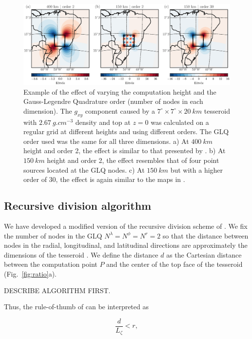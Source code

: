 \documentclass[extra]{gji}
\begin{document}
\begin{figure}
    \centering
    \includegraphics[width=\textwidth]{figs/vary-height-and-order}
    \caption{
        Example of the effect of varying
        the computation height and the Gauss-Legendre Quadrature order
        (number of nodes in each dimension).
        The $g_{xy}$ component caused by a
        $7^\circ \times 7^\circ \times 20\ km$ tesseroid
        with $2.67\ g.cm^{-3}$ density
        and top at $z=0$
        was calculated on a regular grid
        at different heights and using different orders.
        The GLQ order used was the same for all three dimensions.
        a) At $400\ km$ height and order 2, the effect is similar to that
        presented by \citet{Asgharzadeh2007}. b) At $150\ km$ height and order
        2, the effect resembles that of four point sources located at the GLQ
        nodes. c) At $150\ km$ but with a higher order of 30, the effect is
        again similar to the maps in \citet{Asgharzadeh2007}.
    }
    \label{fig:sample}
\end{figure}

\subsection{Recursive division algorithm}

We have developed a modified version
of the recursive division scheme of \citet{Li2011}.
We fix the number of nodes in the GLQ
$N^\lambda=N^\phi=N^r=2$
so that the distance between nodes
in the radial, longitudinal, and latitudinal directions
are approximately the dimensions of the tesseroid
\citep{Wild-Pfeiffer2008}.
We define the distance $d$ as
the Cartesian distance between
the computation point $P$
and the center of the top face of the tesseroid
(Fig.~\ref{fig:ratio}a).

DESCRIBE ALGORITHM FIRST.

Thus, the rule-of-thumb of \citet{Ku1977}
can be interpreted as

\begin{equation}
    \frac{d}{L_\zeta} < r,
    \label{eq:ratio}
\end{equation}
\end{document}
